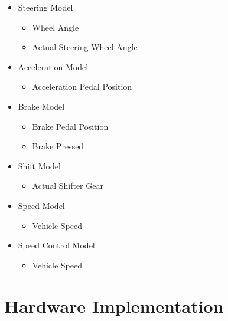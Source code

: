 \documentclass[12pt]{article} %
\begin{document}
\begin{figure}
\begin{itemize}
    \item Steering Model
    \begin{itemize}
    		\item Wheel Angle
    		\item Actual Steering Wheel Angle
    \end{itemize}
    \item Acceleration Model
    \begin{itemize}
    		\item Acceleration Pedal Position
    \end{itemize}
    \item Brake Model
    \begin{itemize}
    		\item Brake Pedal Position
    		\item Brake Pressed
    \end{itemize}
    \item Shift Model
    \begin{itemize}
    		\item Actual Shifter Gear
    \end{itemize}
    \item Speed Model
    \begin{itemize}
    		\item Vehicle Speed
    \end{itemize}
    \item Speed Control Model
    \begin{itemize}
    		\item Vehicle Speed
    \end{itemize}
\end{itemize}

\section{Hardware Implementation}


\end{figure}
\end{document}
